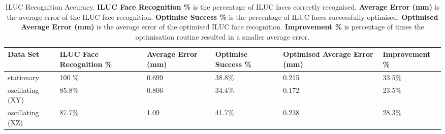 \begin{table}[H]
    \centering
    \begin{tabular}{|p{1.8cm}||p{1.8cm}|p{1.8cm}|p{1.8cm}|p{1.8cm}|p{2.3cm}|}
    \hline
    \textbf{Data Set} & \textbf{ILUC Face Recognition \%} & \textbf{Average Error (mm)} & \textbf{Optimise Success \%} & \textbf{Optimised Average Error (mm)} & \textbf{Improvement \%} \\
    \hline
    stationary & 100 \% & 0.699 & 38.8\% & 0.215 & 33.5\% \\
    \hline
    oscillating (XY) & 85.8\% & 0.806 & 34.4\% & 0.172 & 23.5\% \\
    \hline
    oscillating (XZ) & 87.7\% & 1.09 & 41.7\% & 0.238 & 28.3\% \\
    \hline
    \end{tabular}
    \caption{ILUC Recognition Accuracy. \textbf{ILUC Face Recognition \%} is the percentage of ILUC faces correctly recognised. \textbf{Average Error (mm)} is the average error of the ILUC face recognition. \textbf{Optimise Success \%} is the percentage of ILUC faces successfully optimised. \textbf{Optimised Average Error (mm)} is the average error of the optimised ILUC face recognition. \textbf{Improvement \%} is percentage of times the optimisation routine resulted in a smaller average error.}
    \label{table:iluc_recognition_accuracy}
    \end{table}